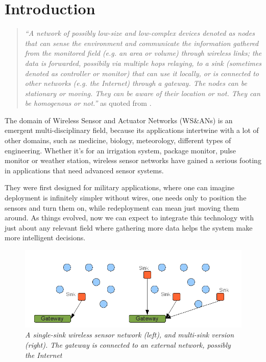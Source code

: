 \normalfont\normalsize
\chapter{Introduction}

\begin{quote} 
{\itshape \small
``A network of possibly low-size and low-complex devices denoted as nodes that can sense the environment and
communicate the information gathered from the monitored field (e.g. an area or volume) through wireless links; the data
is forwarded, possibily via multiple hops relaying, to a sink (sometimes denoted as controller or monitor) that can
use it locally, or is connected to other networks (e.g. the Internet) through a gateway. The nodes can be stationary
or moving. They can be aware of their location or not. They can be homogenous or not.''} as quoted from \cite{Chong2003}.
\end{quote}

The domain of Wireless Sensor and Actuator Networks (WS\&ANs) is an emergent multi-disciplinary field, because its
applications intertwine with a lot of other domains, such as medicine, biology, meteorology, different types of 
engineering. Whether it's for an irrigation system, package monitor, pulse monitor or weather station, 
wireless sensor networks have gained a serious footing in applications that need advanced sensor systems.

They were first designed for military applications, where one can imagine deployment is infinitely simpler without wires, 
one needs only to position the sensors and turn them on, while redeployment can mean just moving them around. As things evolved,
now we can expect to integrate this technology with just about any relevant field where gathering more data helps the system make
more intelligent decisions. 

\begin{figure}[ht]
 \begin{center}
  \includegraphics[scale=0.6]{wsan/wsansink.png}
 \end{center}
\caption{\small \itshape{A single-sink wireless sensor network (left), and multi-sink version (right). The gateway is connected to an 
external network, possibly the Internet}}

\end{figure}

